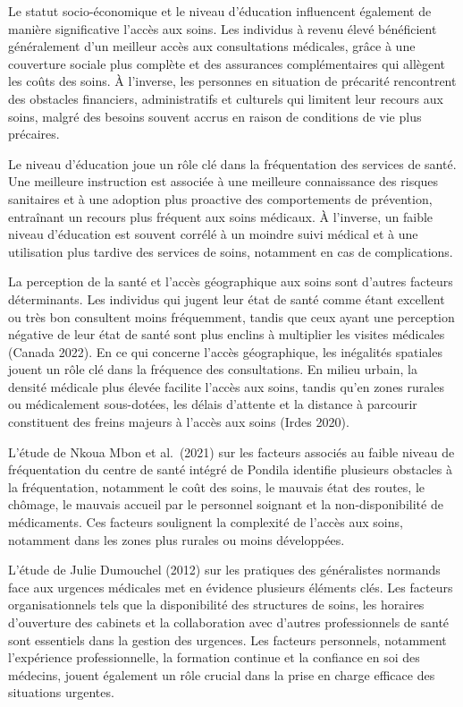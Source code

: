 \documentclass[
]{article}
\begin{document}
Le statut socio-économique et le niveau d'éducation influencent
également de manière significative l'accès aux soins. Les individus à
revenu élevé bénéficient généralement d'un meilleur accès aux
consultations médicales, grâce à une couverture sociale plus complète et
des assurances complémentaires qui allègent les coûts des soins. À
l'inverse, les personnes en situation de précarité rencontrent des
obstacles financiers, administratifs et culturels qui limitent leur
recours aux soins, malgré des besoins souvent accrus en raison de
conditions de vie plus précaires.

Le niveau d'éducation joue un rôle clé dans la fréquentation des
services de santé. Une meilleure instruction est associée à une
meilleure connaissance des risques sanitaires et à une adoption plus
proactive des comportements de prévention, entraînant un recours plus
fréquent aux soins médicaux. À l'inverse, un faible niveau d'éducation
est souvent corrélé à un moindre suivi médical et à une utilisation plus
tardive des services de soins, notamment en cas de complications.

La perception de la santé et l'accès géographique aux soins sont
d'autres facteurs déterminants. Les individus qui jugent leur état de
santé comme étant excellent ou très bon consultent moins fréquemment,
tandis que ceux ayant une perception négative de leur état de santé sont
plus enclins à multiplier les visites médicales (Canada 2022). En ce qui
concerne l'accès géographique, les inégalités spatiales jouent un rôle
clé dans la fréquence des consultations. En milieu urbain, la densité
médicale plus élevée facilite l'accès aux soins, tandis qu'en zones
rurales ou médicalement sous-dotées, les délais d'attente et la distance
à parcourir constituent des freins majeurs à l'accès aux soins (Irdes
2020).

L'étude de Nkoua Mbon et al.~(2021) sur les facteurs associés au faible
niveau de fréquentation du centre de santé intégré de Pondila identifie
plusieurs obstacles à la fréquentation, notamment le coût des soins, le
mauvais état des routes, le chômage, le mauvais accueil par le personnel
soignant et la non-disponibilité de médicaments. Ces facteurs soulignent
la complexité de l'accès aux soins, notamment dans les zones plus
rurales ou moins développées.

L'étude de Julie Dumouchel (2012) sur les pratiques des généralistes
normands face aux urgences médicales met en évidence plusieurs éléments
clés. Les facteurs organisationnels tels que la disponibilité des
structures de soins, les horaires d'ouverture des cabinets et la
collaboration avec d'autres professionnels de santé sont essentiels dans
la gestion des urgences. Les facteurs personnels, notamment l'expérience
professionnelle, la formation continue et la confiance en soi des
médecins, jouent également un rôle crucial dans la prise en charge
efficace des situations urgentes.
\end{document}
